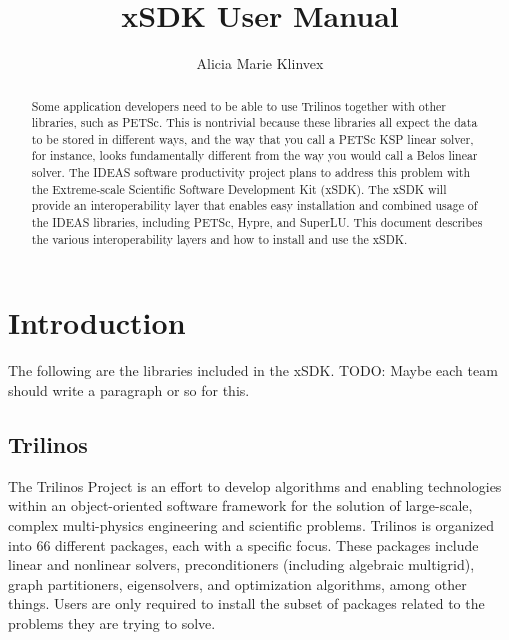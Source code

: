 \documentclass[pdf,12pt,report,strict]{SANDreport}
\title{xSDK User Manual}
\author{Alicia Marie Klinvex}
\begin{document}
\maketitle

\begin{abstract}
Some application developers need to be able to use Trilinos together with other
libraries, such as PETSc.  This is nontrivial because these libraries all expect
the data to be stored in different ways, and the way that you call a PETSc KSP
linear solver, for instance, looks fundamentally different from the way you
would call a Belos linear solver.  The IDEAS software productivity project plans
to address this problem with the Extreme-scale Scientific Software Development
Kit (xSDK).  The xSDK will provide an interoperability layer that enables easy
installation and combined usage of the IDEAS libraries, including PETSc, Hypre,
and SuperLU.  This document describes the various interoperability layers and
how to install and use the xSDK.
\end{abstract}

\newpage

\chapter*{Introduction}
The following are the libraries included in the xSDK.
{\color{red}TODO: Maybe each team should write a paragraph or so for this.}

\section{Trilinos}
The Trilinos Project is an effort to develop algorithms and enabling
technologies within an object-oriented software framework for the solution of
large-scale, complex multi-physics engineering and scientific problems. Trilinos
is organized into 66 different packages, each with a specific focus.  These
packages include linear and nonlinear solvers, preconditioners (including
algebraic multigrid), graph partitioners, eigensolvers, and optimization
algorithms, among other things.  Users are only required to install the subset
of packages related to the problems they are trying to solve.
\end{document}
